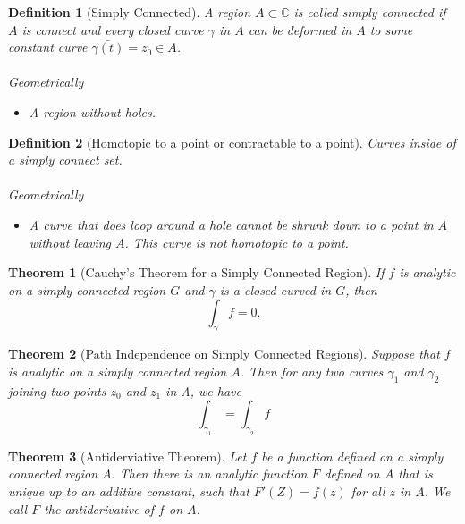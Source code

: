 \documentclass[a4paper]{article}
\newtheorem{definition}{Definition}
\newtheorem{theorem}{Theorem}
\newcommand{\C}{\mathbb{C}}
\begin{document}
\begin{definition}[Simply Connected]
  A region \(A \subset \C\) is called simply connected if \(A\) is connect and every closed curve \(\gamma\) in \(A\) can be deformed in \(A\) to some constant curve \(\bar{\gamma(t)} = z_0 \in A\). 
  
  \paragraph{}{Geometrically}
  \begin{itemize}
    \item A region without holes. 
  \end{itemize}

\end{definition}

\begin{definition}[Homotopic to a point or contractable to a point]
  Curves inside of a simply connect set. 

  \paragraph{}{Geometrically}
  \begin{itemize}
    \item A curve that does loop around a hole cannot be shrunk down to a point in \(A\) without leaving \(A\). This curve is not homotopic to a point. 
  \end{itemize}
\end{definition}


\begin{theorem}[Cauchy's Theorem for a Simply Connected Region]
  If \(f\) is analytic on a simply connected region \(G\) and \(\gamma\) is a closed curved in \(G\), then 
  \[
    \int_\gamma f = 0.
    \]
\end{theorem}

\begin{theorem}[Path Independence on Simply Connected Regions]
  Suppose that \(f\) is analytic on a simply connected region \(A\). 
  Then for any two curves \(\gamma_1\) and \(\gamma_2\) joining two points \(z_0\) and \(z_1\) in A, we have
  \[ \int_{\gamma_1} = \int_{\gamma_2} f\]
\end{theorem}

\begin{theorem}[Antiderviative Theorem]
  Let \(f\) be a function defined on a simply connected region \(A\). 
  Then there is an analytic function \(F\) defined on \(A\) that is unique up to an additive constant, such that \(F'(Z)  = f(z)\) for all \(z\) in \(A\). 
  We call \(F\) the antiderivative of \(f\) on \(A\). 
\end{theorem}
\end{document}
